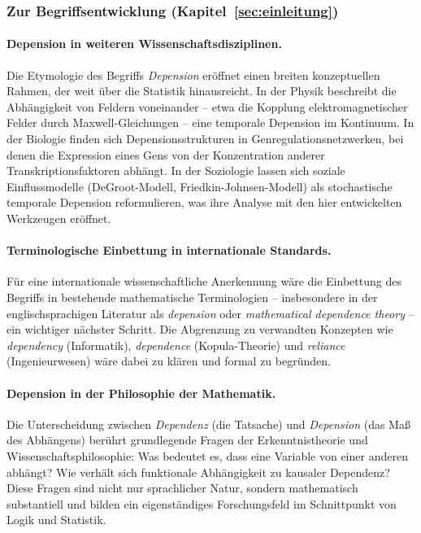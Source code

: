 ﻿\documentclass[12pt, a4paper]{article}
\theoremstyle{definition}
\theoremstyle{remark}
\begin{document}
\subsubsection{Zur Begriffsentwicklung (Kapitel~\ref{sec:einleitung})}

\paragraph{Depension in weiteren Wissenschaftsdisziplinen.}
Die Etymologie des Begriffs \emph{Depension} eröffnet einen breiten konzeptuellen
Rahmen, der weit über die Statistik hinausreicht. In der Physik beschreibt die
Abhängigkeit von Feldern voneinander -- etwa die Kopplung elektromagnetischer Felder
durch Maxwell-Gleichungen -- eine temporale Depension im Kontinuum. In der Biologie
finden sich Depensionsstrukturen in Genregulationsnetzwerken, bei denen die Expression
eines Gens von der Konzentration anderer Transkriptionsfaktoren abhängt. In der
Soziologie lassen sich soziale Einflussmodelle (DeGroot-Modell, Friedkin-Johnsen-Modell)
als stochastische temporale Depension reformulieren, was ihre Analyse mit den hier
entwickelten Werkzeugen eröffnet.

\paragraph{Terminologische Einbettung in internationale Standards.}
Für eine internationale wissenschaftliche Anerkennung wäre die Einbettung des Begriffs
in bestehende mathematische Terminologien -- insbesondere in der englischsprachigen
Literatur als \emph{depension} oder \emph{mathematical dependence theory} -- ein
wichtiger nächster Schritt. Die Abgrenzung zu verwandten Konzepten wie
\emph{dependency} (Informatik), \emph{dependence} (Kopula-Theorie) und
\emph{reliance} (Ingenieurwesen) wäre dabei zu klären und formal zu begründen.

\paragraph{Depension in der Philosophie der Mathematik.}
Die Unterscheidung zwischen \emph{Dependenz} (die Tatsache) und \emph{Depension}
(das Maß des Abhängens) berührt grundlegende Fragen der Erkenntnistheorie und
Wissenschaftsphilosophie: Was bedeutet es, dass eine Variable von einer anderen
abhängt? Wie verhält sich funktionale Abhängigkeit zu kausaler Dependenz? Diese
Fragen sind nicht nur sprachlicher Natur, sondern mathematisch substantiell und
bilden ein eigenständiges Forschungsfeld im Schnittpunkt von Logik und Statistik.
\end{document}

